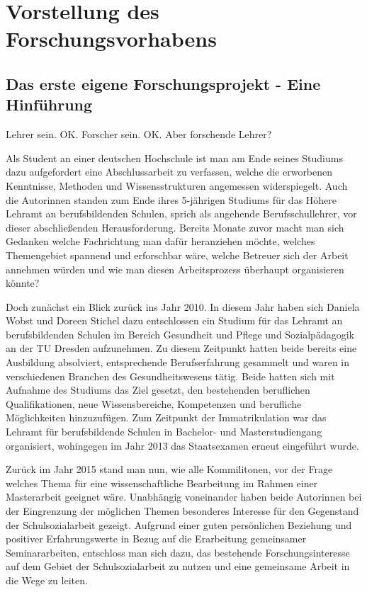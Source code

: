 \section{Vorstellung des Forschungsvorhabens}
\label{sec:VorstellungDesForschungsvorhabens}

\subsection{Das erste eigene Forschungsprojekt - Eine Hinführung}
\label{sec:DasErsteEigeneForschungsprojektEineHinführung}

Lehrer sein. OK. Forscher sein. OK. Aber forschende Lehrer?

Als Student an einer deutschen Hochschule ist man am Ende seines Studiums dazu aufgefordert eine Abschlussarbeit zu verfassen, welche die erworbenen Kenntnisse, Methoden und Wissensstrukturen angemessen widerspiegelt. Auch die Autorinnen standen zum Ende ihres 5-jährigen Studiums für das Höhere Lehramt an berufsbildenden Schulen, sprich als angehende Berufsschullehrer, vor dieser abschließenden Herausforderung. Bereits Monate zuvor macht man sich Gedanken welche Fachrichtung man dafür heranziehen möchte, welches Themengebiet spannend und erforschbar wäre, welche Betreuer sich der Arbeit annehmen würden und wie man diesen Arbeitsprozess überhaupt organisieren könnte? 

Doch zunächst ein Blick zurück ins Jahr 2010. In diesem Jahr haben sich Daniela Wobst und Doreen Stichel dazu entschlossen ein Studium für das Lehramt an berufsbildenden Schulen im Bereich Gesundheit und Pflege und Sozialpädagogik an der TU Dresden aufzunehmen. Zu diesem Zeitpunkt hatten beide bereits eine Ausbildung absolviert, entsprechende Berufserfahrung gesammelt und waren in verschiedenen Branchen des Gesundheitswesens tätig. Beide hatten sich mit Aufnahme des Studiums das Ziel gesetzt, den bestehenden beruflichen Qualifikationen, neue Wissensbereiche, Kompetenzen und berufliche Möglichkeiten hinzuzufügen. Zum Zeitpunkt der Immatrikulation war das Lehramt für berufsbildende Schulen in Bachelor- und Masterstudiengang organisiert, wohingegen im Jahr 2013 das Staatsexamen erneut eingeführt wurde. 

Zurück im Jahr 2015 stand man nun, wie alle Kommilitonen, vor der Frage welches Thema für eine wissenschaftliche Bearbeitung im Rahmen einer Masterarbeit geeignet wäre. Unabhängig voneinander haben beide Autorinnen bei der Eingrenzung der möglichen Themen besonderes Interesse für den Gegenstand der Schulsozialarbeit gezeigt. Aufgrund einer guten persönlichen Beziehung und positiver Erfahrungswerte in Bezug auf die Erarbeitung gemeinsamer Seminararbeiten, entschloss man sich dazu, das bestehende Forschungsinteresse auf dem Gebiet der Schulsozialarbeit zu nutzen und eine gemeinsame Arbeit in die Wege zu leiten. 

